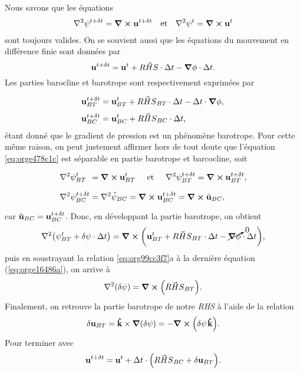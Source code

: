 \documentclass[10pt]{report}
\numberwithin{equation}{section}
\newcommand{\kvf}{\vb{\hat{k}}}
\newcommand{\uu}{\vb{u}}
\newcommand{\grande}{\vphantom{\frac{1}{xx}}}
\newcommand{\pt}{\hspace{1pt}} %
\begin{document}
Nous savons que les équations
\begin{align}
\label{eq:orge478c1c}
   &&\laplacian{\psi^{t+\delta t}} = \curl{\uu^{t+\delta t}}
   &&\text{et}
   &&\laplacian{\psi^{t}} = \curl{\uu^{t}}&&
\end{align}
sont toujours valides. 
On se souvient aussi que les équations du mouvement en différence finie sont données par 
\begin{equation}
   \uu^{t+\delta t} =
   \uu^t + \vec{RHS}\cdot \Delta t
   - \gradient{\phi}\cdot \Delta t.
\end{equation}
Les parties barocline et barotrope sont respectivement exprimées par
\begin{subequations}
\begin{align}
   &\uu_{BT}^{t+\delta t} = \uu_{BT}^{t} + \vec{RHS}_{BT}\cdot \Delta t - \Delta t\cdot \gradient{\phi},\grande\\
   &\uu_{BC}^{t+\delta t} = \uu_{BC}^{t} + \vec{RHS}_{BC}\cdot \Delta t,
\end{align}
\end{subequations}
étant donné que le gradient de pression est un phénomène barotrope.
Pour cette même raison, on peut justement affirmer hors de tout doute que l'équation \ref{eq:orge478c1c} est séparable en partie barotrope et barcocline, soit
\begin{subequations}
\label{eq:org99cc3f7}
\begin{align}
   &\grande\laplacian{\psi_{BT}^{t}}\ \pt = \curl{\uu_{BT}^{t}}
   \hspace{0.5cm}\text{et}\hspace{0.5cm}
   \laplacian{\psi_{BT}^{t+\delta t}} = \curl{\uu_{BT}^{t+\delta t}},\\
   &\grande\laplacian{\psi_{BC}^{t+\delta t}} = \laplacian{\tilde{\psi}_{BC}} = \curl{\uu_{BC}^{t+\delta t}} = \curl{\tilde{\uu}_{BC}},
\end{align}
\end{subequations}
car \(\tilde{\uu}_{BC} = \uu^{t+\delta t}_{BC}\).
Donc, en développant la partie barotrope, on obtient
\begin{equation}
\label{eq:orge16486a}
   \laplacian(\psi_{BT}^t+\delta \psi \cdot \Delta t) = \curl(\uu^t_{BT} + \vec{RHS}_{BT}\cdot\Delta t - \cancelto{0}{\gradient{\phi}}\cdot \Delta t),
\end{equation}
puis en soustrayant la relation \ref{eq:org99cc3f7}a à la dernière équation (\ref{eq:orge16486a}), on arrive à
\begin{equation}
   \laplacian(\delta \psi) = \curl(\vec{RHS}_{BT}).
\end{equation}
Finalement, on retrouve la partie barotrope de notre \emph{RHS} à l'aide de la relation
\begin{equation}
   \delta \uu_{BT} = \kvf\times\gradient(\delta \psi) = -\curl(\delta\psi\pt\kvf).
\end{equation}
Pour terminer avec
\begin{equation}
   \uu^{t+\delta t} =
   \uu^t + \Delta t\cdot\qty(\vec{RHS}_{BC}
   + \delta \uu_{BT}).
\end{equation}
\end{document}
